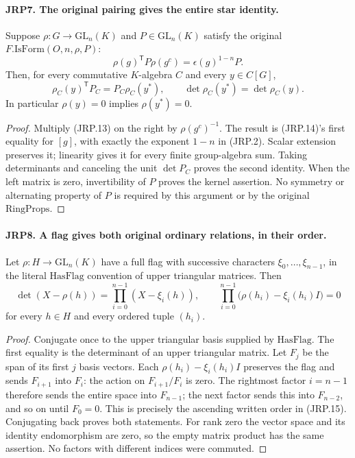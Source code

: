 \paragraph{JRP7. The original pairing gives the entire star identity.}
\label{claim:JRP7}
Suppose \(\rho:G\to\mathrm{GL}_n(K)\) and
\(P\in\mathrm{GL}_n(K)\) satisfy the original
\(F.\mathrm{IsForm}(O,n,\rho,P)\):
\[
 \rho(g)^{\mathsf T}P\rho(g^c)=\epsilon(g)^{1-n}P.
 \tag{JRP.13}
\]
Then, for every commutative \(K\)-algebra \(C\) and every
\(y\in C[G]\),
\[
 \rho_C(y)^{\mathsf T}P_C=P_C\rho_C(y^*),\qquad
       \det\rho_C(y^*)=\det\rho_C(y).
 \tag{JRP.14}
\]
In particular \(\rho(y)=0\) implies \(\rho(y^*)=0\).
\begin{proof}
Multiply (JRP.13) on the right by \(\rho(g^c)^{-1}\).
The result is (JRP.14)'s first equality for \([g]\), with
exactly the exponent \(1-n\) in (JRP.2).  Scalar extension
preserves it; linearity gives it for every finite group-algebra
sum.  Taking determinants and canceling the unit \(\det P_C\)
proves the second identity.  When the left matrix is zero,
invertibility of \(P\) proves the kernel assertion.  No symmetry
or alternating property of \(P\) is required by this argument
or by the original \(\mathrm{RingProps}\).
\end{proof}

\paragraph{JRP8. A flag gives both original ordinary relations, in their order.}
\label{claim:JRP8}
Let \(\rho:H\to\mathrm{GL}_n(K)\) have a full flag with
successive characters \(\xi_0,\ldots,\xi_{n-1}\), in the
literal \(\mathrm{HasFlag}\) convention of upper triangular
matrices.  Then
\[
 \det(X-\rho(h))=\prod_{i=0}^{n-1}(X-\xi_i(h)),
 \qquad
 \prod_{i=0}^{n-1}\bigl(\rho(h_i)-\xi_i(h_i)I\bigr)=0
 \tag{JRP.15}
\]
for every \(h\in H\) and every ordered tuple \((h_i)\).
\begin{proof}
Conjugate once to the upper triangular basis supplied by
\(\mathrm{HasFlag}\).  The first equality is the determinant
of an upper triangular matrix.  Let \(F_j\) be the span of
its first \(j\) basis vectors.  Each
\(\rho(h_i)-\xi_i(h_i)I\) preserves the flag and sends
\(F_{i+1}\) into \(F_i\): the action on
\(F_{i+1}/F_i\) is zero.  The rightmost factor \(i=n-1\)
therefore sends the entire space into \(F_{n-1}\); the next
factor sends this into \(F_{n-2}\), and so on until \(F_0=0\).
This is precisely the ascending written order in (JRP.15).
Conjugating back proves both statements.  For rank zero the
vector space and its identity endomorphism are zero, so the empty
matrix product has the same assertion.  No factors with different
indices were commuted.
\end{proof}

